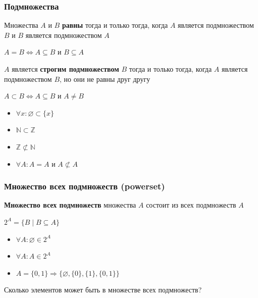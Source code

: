 \documentclass{beamer}
\begin{document}
\begin{frame}[fragile]
  \transwipe[direction=90]
  \frametitle{Подмножества}
  Множества $A$ и $B$ \textbf{равны} тогда и только тогда, когда $A$ является подмножеством $B$ и $B$ является подмножеством $A$  
  
  \begin{center}
    $ A = B \iff A \subseteq B $ и $ B \subseteq A$
  \end{center}
  \pause
  $A$ является \textbf{строгим подмножеством} $B$ тогда и только тогда, когда $A$ является подмножеством $B$, но они не равны друг другу
  
  \begin{center}
     $ A \subset B \iff A \subseteq B $ и $ A \neq B $   
  \end{center} 
  
  \pause 
  \begin{itemize}
     \item $\forall x : \varnothing \subset \{ x \}$
     \item $\mathbb{N} \subset \mathbb{Z}$
     \item $\mathbb{Z} \not\subset \mathbb{N}$
     \item $\forall A: A = A $ и $ A \not\subset A $

  \end{itemize}
\end{frame}

\begin{frame}[fragile]
  \transwipe[direction=90]
  \frametitle{Множество всех подмножеств (powerset)}
  \textbf{Множество всех подмножеств} множества $A$ состоит из всех подмножеств $A$
  
  \begin{center}
    $2^A = \{ B \mid B \subseteq A \}$
  \end{center}
  
  \begin{itemize}
    \item $\forall A: \varnothing \in 2^A$
    \item $\forall A: A \in 2^A$
    \item $A = \{ 0, 1 \} \Rightarrow \{ \varnothing, \{ 0 \}, \{ 1 \}, \{ 0, 1 \} \} $
  \end{itemize}
  
  \pause 
  Сколько элементов может быть в множестве всех подмножеств?
\end{frame}
\end{document}

